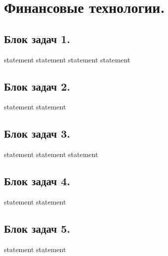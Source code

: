 \chapter{Финансовые технологии.}

\section{Блок задач 1.}

{statement}
{statement}
{statement}
{statement}

\section{Блок задач 2.}

{statement}
{statement}

\section{Блок задач 3.}

{statement}
{statement}
{statement}

\section{Блок задач 4.}

{statement}
{statement}

\section{Блок задач 5.}

{statement}
{statement}

